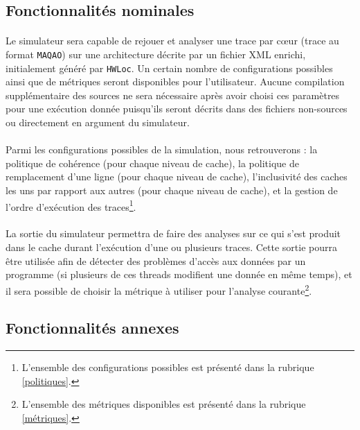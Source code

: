 \subsection{Fonctionnalités nominales}

\paragraph{}
Le simulateur sera capable de rejouer et analyser une trace par c\oe ur (trace au format \texttt{MAQAO}) sur une architecture décrite par un fichier XML enrichi, initialement généré par \texttt{HWLoc}. Un certain nombre de configurations possibles ainsi que de métriques seront disponibles pour l'utilisateur. Aucune compilation supplémentaire des sources ne sera nécessaire après avoir choisi ces paramètres pour une exécution donnée puisqu'ils seront décrits dans des fichiers non-sources ou directement en argument du simulateur. 

\paragraph{}
Parmi les configurations possibles de la simulation, nous retrouverons : la politique de cohérence (pour chaque niveau de cache), la politique de remplacement d'une ligne (pour chaque niveau de cache), l'inclusivité des caches les uns par rapport aux autres (pour chaque niveau de cache), et la gestion de l'ordre d'exécution des traces\footnote{L'ensemble des configurations possibles est présenté dans la rubrique \ref{politiques}.}.

\paragraph{}
La sortie du simulateur permettra de faire des analyses sur ce qui s'est produit dans le cache durant l'exécution d'une ou plusieurs traces. Cette sortie pourra être utilisée afin de détecter des problèmes d'accès aux données par un programme (si plusieurs de ces threads modifient une donnée en même temps), et il sera possible de choisir la métrique à utiliser pour l'analyse courante\footnote{L'ensemble des métriques disponibles est présenté dans la rubrique \ref{métriques}.}. 

\newpage

\subsection{Fonctionnalités annexes}

